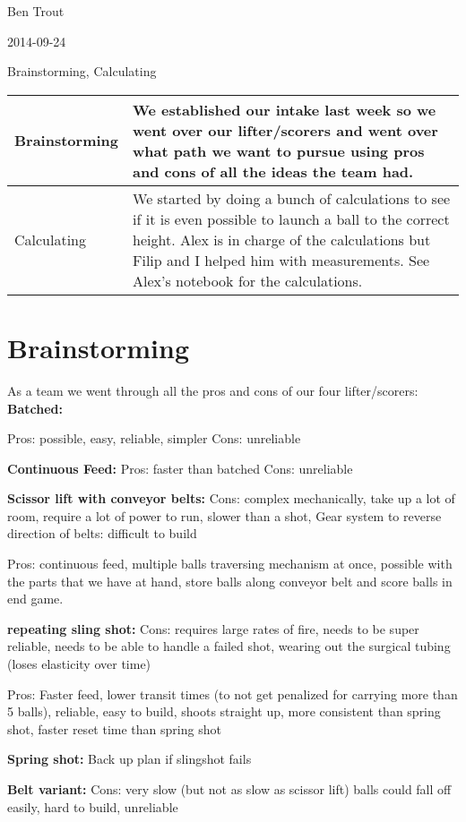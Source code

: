 Ben Trout

2014-09-24

Brainstorming, Calculating

\begin{tabular}{|p{5cm}|p{5cm}|}
 \hline
 Brainstorming&
 We established our intake last week so we went over our lifter/scorers and went over what path we want to pursue using pros and cons of all the ideas the team had.
 \\
 \hline
 Calculating&  
 We started by doing a bunch of calculations to see if it is even possible to launch a ball to the correct height. Alex is in charge of the calculations but Filip and I helped  him with measurements. See Alex’s notebook for the calculations.
 \\
 \hline
\end{tabular}

\section*{Brainstorming}
As a team we went through all the pros and cons of our four lifter/scorers: 
\textbf{Batched:}

Pros: possible, easy, reliable, simpler
Cons: unreliable

\textbf{Continuous Feed:}
Pros: faster than batched
Cons: unreliable

\textbf{Scissor lift with conveyor belts:}
Cons: complex mechanically, take up a lot of room, require a lot of power to run, slower than a shot, Gear system to reverse direction of belts: difficult to build

Pros: continuous feed, multiple balls traversing mechanism at once, possible with the parts that we have at hand, store balls along conveyor belt and score balls in end game. 

\textbf{repeating sling shot:}
Cons: requires large rates of fire, needs to be super reliable, needs to be able to handle a failed shot, wearing out the surgical tubing (loses elasticity over time) 

Pros: Faster feed, lower transit times (to not get penalized for carrying more than 5 balls), reliable, easy to build, shoots straight up, more consistent than spring shot, faster reset time than spring shot

\textbf{Spring shot:}
 Back up plan if slingshot fails

\textbf{Belt variant:}
Cons: very slow (but not as slow as scissor lift)  balls could fall off easily, hard to build, unreliable

